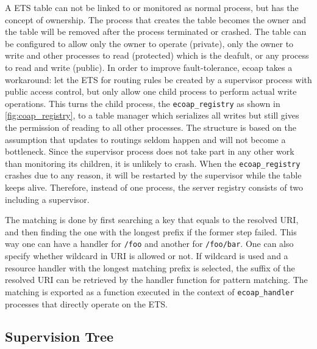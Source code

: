 A ETS table can not be linked to or monitored as normal process, but has the concept of ownership. The process that creates the table becomes the owner and the table will be removed after the process terminated or crashed. The table can be configured to allow only the owner to operate (private), only the owner to write and other processes to read (protected) which is the deafult, or any process to read and write (public). In order to improve fault-tolerance, ecoap takes a workaround: let the ETS for routing rules be created by a supervisor process with public access control, but only allow one child process to perform actual write operations. This turns the child process, the \verb|ecoap_registry| as shown in \autoref{fig:coap_registry}, to a table manager which serializes all writes but still gives the permission of reading to all other processes. The structure is based on the assumption that updates to routings seldom happen and will not become a bottleneck. Since the supervisor process does not take part in any other work than monitoring its children, it is unlikely to crash. When the \verb|ecoap_registry| crashes due to any reason, it will be restarted by the supervisor while the table keeps alive. Therefore, instead of one process, the server registry consists of two including a supervisor. 

The matching is done by first searching a key that equals to the resolved URI, and then finding the one with the longest prefix if the former step failed. This way one can have a handler for \verb|/foo| and another for \verb|/foo/bar|. One can also specify whether wildcard in URI is allowed or not. If wildcard is used and a resource handler with the longest matching prefix is selected, the suffix of the resolved URI can be retrieved by the handler function for pattern matching. The matching is exported as a function executed in the context of \verb|ecoap_handler| processes that directly operate on the ETS. 

\subsection{Supervision Tree}\label{supervision_tree}



